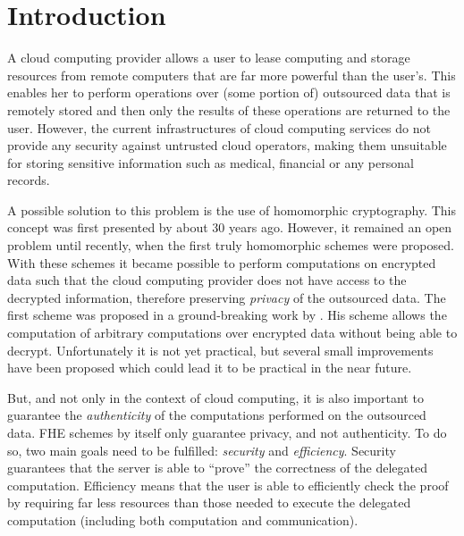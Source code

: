 \chapter{Introduction}\label{chap:intro}
A cloud computing provider allows a user to lease computing and storage
resources from remote computers that are far more powerful than the user's.
This enables her to perform operations over (some portion of) outsourced data
that is remotely stored and then only the results of these operations are
returned to the user. However, the current infrastructures of cloud computing
services do not provide any security against untrusted cloud operators, making
them unsuitable for storing sensitive information such as medical, financial or
any personal records.

A possible solution to this problem is the use of homomorphic cryptography.
This concept was first presented by \textcite{rivest:adleman:dertouzos:1978}
about 30 years ago. However, it remained an open problem until recently, when
the first truly homomorphic schemes were proposed. With these schemes it became
possible to perform computations on encrypted data such that the cloud
computing provider does not have access to the decrypted information, therefore
preserving \emph{privacy} of the outsourced data. The first  scheme was proposed in a ground-breaking work by
\textcite{gentry:2009:FHE}. His scheme allows the computation of arbitrary
computations over encrypted data without being able to decrypt. Unfortunately
it is not yet practical, but several small improvements have been proposed
which could lead it to be practical in the near future.

But, and not only in the context of cloud computing, it is also important to
guarantee the \emph{authenticity} of the computations performed on the
outsourced data. FHE schemes by itself only guarantee privacy, and not
authenticity. To do so, two main goals need to be fulfilled: \emph{security}
and \emph{efficiency}. Security guarantees that the server is able to ``prove''
the correctness of the delegated computation. Efficiency means that the user is
able to efficiently check the proof by requiring far less resources than those
needed to execute the delegated computation (including both computation and
communication).

